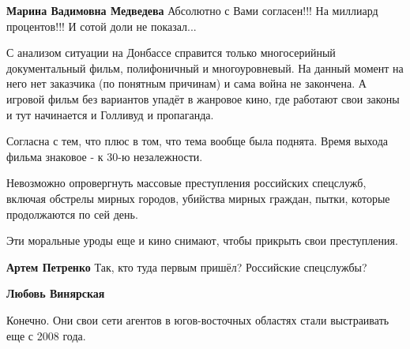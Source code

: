 \begin{itemize}
\begin{itemize}
 
\textbf{Марина Вадимовна Медведева} Абсолютно с Вами согласен!!! На миллиард процентов!!! И сотой доли не показал...
\end{itemize}


С анализом ситуации на Донбассе справится только многосерийный документальный
фильм, полифоничный и многоуровневый. На данный момент на него нет заказчика
(по понятным причинам) и сама война не закончена. А игровой фильм без вариантов
упадёт в жанровое кино, где работают свои законы и тут начинается и Голливуд и
пропаганда.

Согласна с тем, что плюс в том, что тема вообще была поднята. Время выхода
фильма знаковое - к 30-ю незалежности.


Невозможно опровергнуть массовые преступления российских спецслужб, включая
обстрелы мирных городов, убийства мирных граждан, пытки, которые продолжаются
по сей день.

Эти моральные уроды еще и кино снимают, чтобы прикрыть свои преступления.

\begin{itemize}
 
\textbf{Артем Петренко} Так, кто туда первым пришёл? Российские спецслужбы?

 
\textbf{Любовь Винярская} 

Конечно. Они свои сети агентов в югов-восточных областях стали выстраивать еще с 2008 года.


\end{itemize}
\end{itemize}
